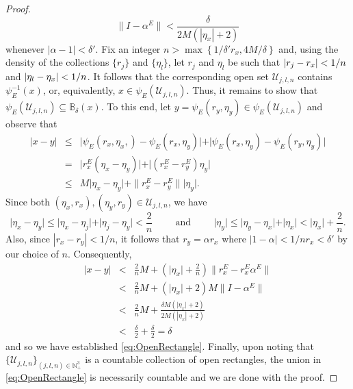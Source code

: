 \documentclass[11pt]{article}
\theoremstyle{remark}
\begin{document}
\begin{proof}
\begin{equation*}
\|I-\alpha ^E\|< \frac{\delta}{2M (  |\eta_x|+2)}
\end{equation*}
whenever $|\alpha-1|<\delta'$. Fix an integer $n>\max \left\{1/\delta'r_x, 4M/\delta \right\}$ and, using the density of the collections $\{r_j\}$ and $\{\eta_l\}$, let $r_j$ and $ \eta_l$ be such that $\abs{r_j - r_x } < 1/n$ and $\abs{\eta_l - \eta_x} < 1/n$. It follows that the corresponding open set $\mathcal{U}_{j,l,n}$ contains $\psi_E^{-1}(x)$, or, equivalently, $x\in \psi_E(\mathcal{U}_{j,l,n})$. Thus, it remains to show that $\psi_E(\mathcal{U}_{j,l,n}) \subseteq \mathbb{B}_\delta(x)$. To this end, let $y=\psi_E(r_y,\eta_y)\in\psi_E(\mathcal{U}_{j,l,n})$ and observe that
\begin{eqnarray*}
| x - y | &\leq& \vert \psi_E(r_x,\eta_x,) - \psi_E(r_x,\eta_y) \vert 
    + \vert \psi_E(r_x,\eta_y) - \psi_E(r_y,\eta_y) \vert\\
    &=&  \vert r_x^E (\eta_x - \eta_y) \vert + \vert (r_x^E - r_y^E) \eta_y \vert\\
    &\leq& M\vert \eta_x - \eta_y \vert + \|{r_x^E - r_y^E}\|  \vert \eta_y \vert.
\end{eqnarray*}
Since both $(\eta_x,r_x),(\eta_y,r_y) \in \mathcal{U}_{j,l,n}$, we have
\begin{equation*}
    \vert \eta_x - \eta_y \vert \leq \vert \eta_x - \eta_j \vert + \vert \eta_j - \eta_y \vert < \frac{2}{n}
\hspace{1cm}\mbox{and}\hspace{1cm}
    \vert \eta_y \vert \leq \vert \eta_y - \eta_x \vert + \vert \eta_x \vert < \vert \eta_x \vert + \frac{2}{n}.
\end{equation*}
Also, since $|r_x-r_y|<1/n$, it follows that $r_y=\alpha r_x$ where $|1-\alpha|<1/nr_x < \delta'$ by our choice of $n$. Consequently,
\begin{eqnarray*}
    \vert x - y \vert 
    &< & \frac{2}{n} M+ \left( \vert \eta_x \vert + \frac{2}{n} \right) \|{r_x^E -  r_x^E \alpha^E}\|   \\ 
    &<& \frac{2}{n}M + \left( \vert \eta_x \vert + 2 \right)M\| I - \alpha^E\| \\
    &<&  \frac{2}{n}M +  \frac{\delta M \left( \vert \eta_x \vert + 2\right) }{2M (| \eta_x | + 2)}  \\
    &<& \frac{\delta}{2} + \frac{\delta}{2}=\delta 
\end{eqnarray*}
and so we have established \eqref{eq:OpenRectangle}. Finally, upon noting that $\{\mathcal{U}_{j,l,n}\}_{(j,l,n)\in\mathbb{N}_+^3}$ is a countable collection of open rectangles, the union in \eqref{eq:OpenRectangle} is necessarily countable and we are done with the proof.
\end{proof}
\end{document}
